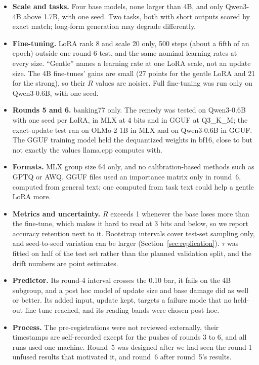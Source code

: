 \documentclass[10pt]{article}
\begin{document}
\begin{itemize}
\item \textbf{Scale and tasks.} Four base models, none larger than 4B, and only Qwen3-4B above 1.7B, with one seed. Two tasks, both with short outputs scored by exact match; long-form generation may degrade differently.
\item \textbf{Fine-tuning.} LoRA rank 8 and scale 20 only, 500 steps (about a fifth of an epoch) outside one round-6 test, and the same nominal learning rates at every size. ``Gentle'' names a learning rate at one LoRA scale, not an update size. The 4B fine-tunes' gains are small (27 points for the gentle LoRA and 21 for the strong), so their $R$ values are noisier. Full fine-tuning was run only on Qwen3-0.6B, with one seed.
\item \textbf{Rounds 5 and 6.} banking77 only. The remedy was tested on Qwen3-0.6B with one seed per LoRA, in MLX at 4 bits and in GGUF at Q3\_K\_M; the exact-update test ran on OLMo-2 1B in MLX and on Qwen3-0.6B in GGUF. The GGUF training model held the dequantized weights in bf16, close to but not exactly the values llama.cpp computes with.
\item \textbf{Formats.} MLX group size 64 only, and no calibration-based methods such as GPTQ or AWQ. GGUF files used an importance matrix only in round~6, computed from general text; one computed from task text could help a gentle LoRA more.
\item \textbf{Metrics and uncertainty.} $R$ exceeds 1 whenever the base loses more than the fine-tune, which makes it hard to read at 3 bits and below, so we report accuracy retention next to it. Bootstrap intervals cover test-set sampling only, and seed-to-seed variation can be larger (Section~\ref{sec:replication}). $\tau$ was fitted on half of the test set rather than the planned validation split, and the drift numbers are point estimates.
\item \textbf{Predictor.} Its round-4 interval crosses the 0.10 bar, it fails on the 4B subgroup, and a post hoc model of update size and base damage did as well or better. Its added input, update kept, targets a failure mode that no held-out fine-tune reached, and its reading bands were chosen post hoc.
\item \textbf{Process.} The pre-registrations were not reviewed externally, their timestamps are self-recorded except for the pushes of rounds 3 to 6, and all runs used one machine. Round~5 was designed after we had seen the round-1 unfused results that motivated it, and round~6 after round~5's results.
\end{itemize}
\end{document}
